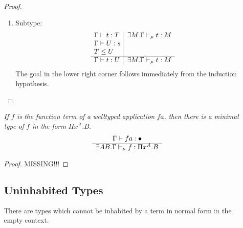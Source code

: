 \begin{theorem}
\begin{proof}
\begin{enumerate}
\begin{enumerate}
                \item Subtype:
                $$
                \begin{array}{l|l}
                    \Gamma \vdash t : T
                    &
                    \exists M. \Gamma \vdash_\mu t: M
                    \\
                    \Gamma \vdash U : s
                    \\
                    T \le U
                    \\
                    \hline
                    \Gamma \vdash t : U
                    &
                    \exists M. \Gamma \vdash_\mu t: M
                \end{array}
                $$
                The goal in the lower right corner follows immediately from the
                    induction hypothesis.
            \end{enumerate}
        \end{enumerate}
    \end{proof}
\end{theorem}



\begin{theorem}
    \label{thm:MinimalTypeFunctionTerm}
    \emph{If $f$ is the function term of a welltyped application $fa$, then
    there is a minimal type of $f$ in the form $\Pi x^A. B$}.
    $$
    \begin{array}{c} 
        \Gamma \vdash f a : \bullet
     \\ \hline 
        \exists AB. \Gamma \vdash_\mu f : \Pi x^A. B
    \end{array}
    $$
    \begin{proof}

        MISSING!!!
    \end{proof}
\end{theorem}


\subsection{Uninhabited Types}



There are types which cannot be inhabited by a term in normal form in the empty
context.

